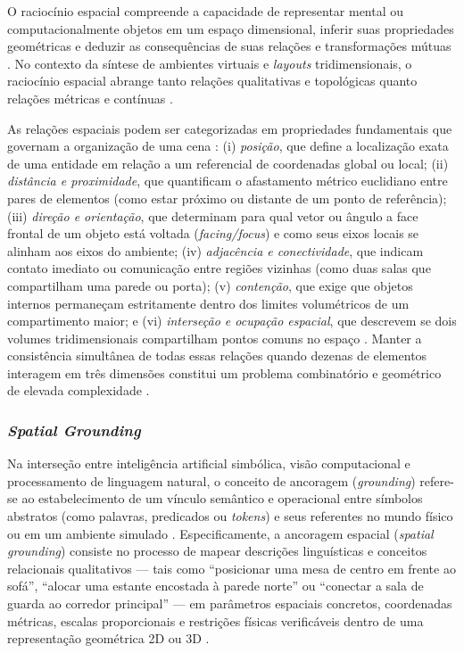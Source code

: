 O raciocínio espacial compreende a capacidade de representar mental ou computacionalmente objetos em um espaço dimensional, inferir suas propriedades geométricas e deduzir as consequências de suas relações e transformações mútuas \cite{sun2024roomplanner, xu2025constraint}. No contexto da síntese de ambientes virtuais e \textit{layouts} tridimensionais, o raciocínio espacial abrange tanto relações qualitativas e topológicas quanto relações métricas e contínuas \cite{xu2025constraint, chen2025narrative}.

As relações espaciais podem ser categorizadas em propriedades fundamentais que governam a organização de uma cena \cite{xu2025constraint, sun2024roomplanner, chen2025narrative}: (i) \textit{posição}, que define a localização exata de uma entidade em relação a um referencial de coordenadas global ou local; (ii) \textit{distância e proximidade}, que quantificam o afastamento métrico euclidiano entre pares de elementos (como estar próximo ou distante de um ponto de referência); (iii) \textit{direção e orientação}, que determinam para qual vetor ou ângulo a face frontal de um objeto está voltada (\textit{facing/focus}) e como seus eixos locais se alinham aos eixos do ambiente; (iv) \textit{adjacência e conectividade}, que indicam contato imediato ou comunicação entre regiões vizinhas (como duas salas que compartilham uma parede ou porta); (v) \textit{contenção}, que exige que objetos internos permaneçam estritamente dentro dos limites volumétricos de um compartimento maior; e (vi) \textit{interseção e ocupação espacial}, que descrevem se dois volumes tridimensionais compartilham pontos comuns no espaço \cite{xu2025constraint, sun2024roomplanner, xu2025databasedrivenframework3dlevel}. Manter a consistência simultânea de todas essas relações quando dezenas de elementos interagem em três dimensões constitui um problema combinatório e geométrico de elevada complexidade \cite{xu2025constraint, feng2026repurposing3dgenerativemodel}.

\subsubsection{\textit{Spatial Grounding}}
\label{sec:conceito_spatial_grounding}

Na interseção entre inteligência artificial simbólica, visão computacional e processamento de linguagem natural, o conceito de ancoragem (\textit{grounding}) refere-se ao estabelecimento de um vínculo semântico e operacional entre símbolos abstratos (como palavras, predicados ou \textit{tokens}) e seus referentes no mundo físico ou em um ambiente simulado \cite{Gallotta_2024, chen2025narrative}. Especificamente, a ancoragem espacial (\textit{spatial grounding}) consiste no processo de mapear descrições linguísticas e conceitos relacionais qualitativos --- tais como ``posicionar uma mesa de centro em frente ao sofá'', ``alocar uma estante encostada à parede norte'' ou ``conectar a sala de guarda ao corredor principal'' --- em parâmetros espaciais concretos, coordenadas métricas, escalas proporcionais e restrições físicas verificáveis dentro de uma representação geométrica 2D ou 3D \cite{hu2024scenecraft, sun2024roomplanner, chen2025narrative, ocal2024sceneteller}.

